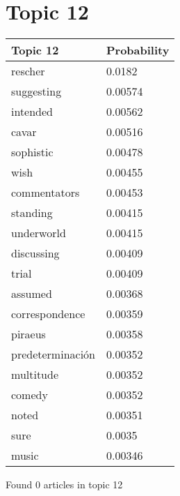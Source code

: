 \documentclass{article}
\begin{document}
\section*{Topic 12}\vfill
\begin{tabular}{ll}
\toprule
         Topic 12 & Probability \\
\midrule
          rescher &      0.0182 \\
       suggesting &     0.00574 \\
         intended &     0.00562 \\
            cavar &     0.00516 \\
        sophistic &     0.00478 \\
             wish &     0.00455 \\
     commentators &     0.00453 \\
         standing &     0.00415 \\
       underworld &     0.00415 \\
       discussing &     0.00409 \\
            trial &     0.00409 \\
          assumed &     0.00368 \\
   correspondence &     0.00359 \\
          piraeus &     0.00358 \\
 predeterminación &     0.00352 \\
        multitude &     0.00352 \\
           comedy &     0.00352 \\
            noted &     0.00351 \\
             sure &      0.0035 \\
            music &     0.00346 \\
\bottomrule
\end{tabular}

\vfill
Found 0 articles in topic 12

\vfill
\newpage


\centering
\thispagestyle{empty}
\end{document}

